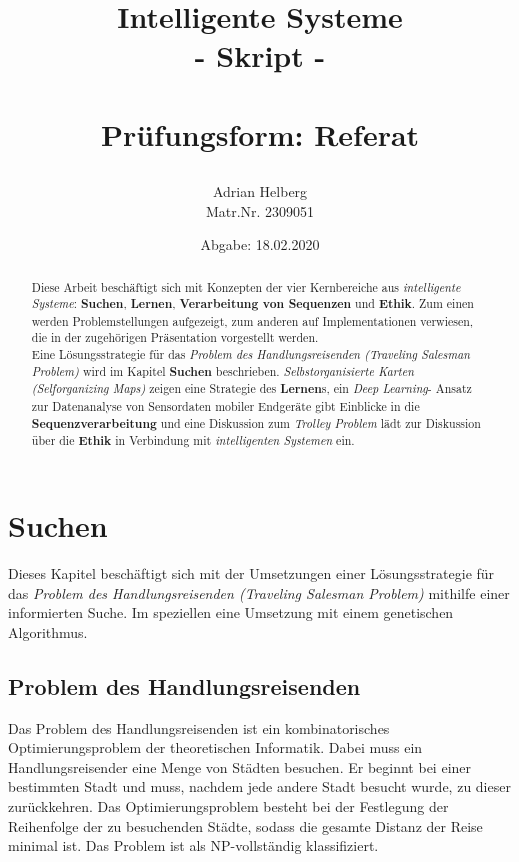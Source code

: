 \documentclass[11pt]{article}
\title{
    \begin{center}
        \Huge \textbf{Intelligente Systeme}\\
        {\color{blue}- Skript -}\\~\\
        \Large Prüfungsform: Referat
    \end{center}
}
\author{Adrian Helberg\\ Matr.Nr. 2309051}
\date{Abgabe: 18.02.2020}
\begin{document}
    \maketitle

    \begin{abstract}
        Diese Arbeit beschäftigt sich mit Konzepten der vier Kernbereiche aus \textit{intelligente
        Systeme}: \textbf{Suchen}, \textbf{Lernen}, \textbf{Verarbeitung von Sequenzen} und
        \textbf{Ethik}. Zum einen werden Problemstellungen aufgezeigt, zum anderen auf
        Implementationen verwiesen, die in der zugehörigen Präsentation vorgestellt werden.\\ Eine
        Lösungsstrategie für das \textit{Problem des Handlungsreisenden (Traveling Salesman
        Problem)} wird im Kapitel \textbf{Suchen} beschrieben. \textit{Selbstorganisierte Karten
            (Selforganizing Maps)} zeigen eine Strategie des \textbf{Lernen}s, ein \textit{Deep
        Learning}- Ansatz zur Datenanalyse von Sensordaten mobiler Endgeräte gibt Einblicke in
        die \textbf{Sequenzverarbeitung} und eine Diskussion zum \textit{Trolley Problem} lädt
        zur Diskussion über die \textbf{Ethik} in Verbindung mit \textit{intelligenten Systemen}
        ein.
    \end{abstract}

    \tableofcontents
    \newpage

    \section{Suchen}

    Dieses Kapitel beschäftigt sich mit der Umsetzungen einer Lösungsstrategie für das
    \textit{Problem des Handlungsreisenden (Traveling Salesman Problem)} mithilfe einer
    informierten Suche. Im speziellen eine Umsetzung mit einem genetischen Algorithmus.

    \subsection{Problem des Handlungsreisenden}
    Das Problem des Handlungsreisenden ist ein kombinatorisches Optimierungsproblem der
    theoretischen Informatik. Dabei muss ein Handlungsreisender eine Menge von Städten besuchen.
    Er beginnt bei einer bestimmten Stadt und muss, nachdem jede andere Stadt besucht wurde, zu
    dieser zurückkehren. Das Optimierungsproblem besteht bei der Festlegung der Reihenfolge der zu
    besuchenden Städte, sodass die gesamte Distanz der Reise minimal ist. Das Problem ist als
    NP-vollständig klassifiziert.
\end{document}
